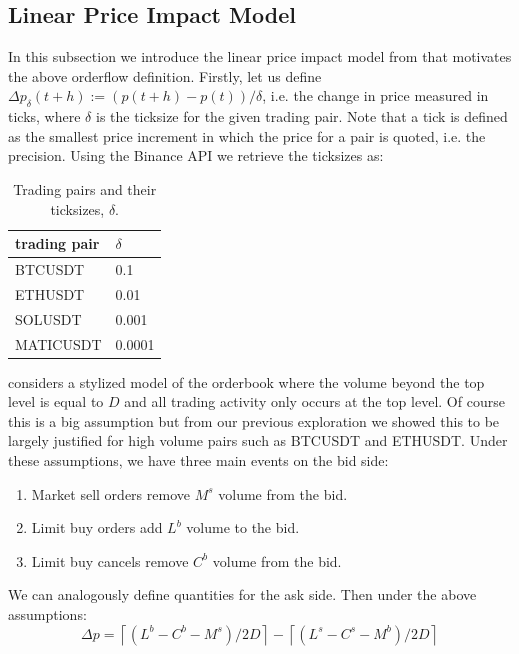 \subsection{Linear Price Impact Model}
In this subsection we introduce the linear price impact model from \cite{CONT2013} that motivates
the above orderflow definition.
Firstly, let us define $\Delta p_{\delta}(t+h) := (p(t+h) - p(t)) / \delta$, i.e. the change in price
measured in ticks, where $\delta$ is the ticksize for the given trading pair. Note that a tick
is defined as the smallest price increment in which the price for a pair is quoted, i.e. the precision.
Using the Binance API we
retrieve the ticksizes as:  %
\begin{table}[ht]
    \centering
    \begin{tabular}{ll}
        \toprule
        trading pair & $\delta$ \\
        \midrule
        BTCUSDT & 0.1 \\
        ETHUSDT & 0.01 \\
        SOLUSDT & 0.001 \\
        MATICUSDT & 0.0001 \\
        \bottomrule
    \end{tabular}
    \caption{Trading pairs and their ticksizes, $\delta$.}
\end{table}

\cite{CONT2013} considers a stylized model of the orderbook where the volume beyond the top level
is equal to $D$ and all trading activity only occurs at the top level. Of course this is a big
assumption but from our previous exploration we showed this to be largely justified for high volume pairs such
as BTCUSDT and ETHUSDT. Under these assumptions, we have three main events on the bid side:
\begin{enumerate}
    \item Market sell orders remove $M^s$ volume from the bid.
    \item Limit buy orders add $L^b$ volume to the bid.
    \item Limit buy cancels remove $C^b$ volume from the bid.
\end{enumerate}
We can analogously define quantities for the ask side.
Then under the above assumptions:
\begin{equation}
    \Delta p = \left\lceil (L^b - C^b - M^s) / 2D \right\rceil  - \left\lceil (L^s -C^s - M^b) / 2D \right\rceil
\end{equation}

